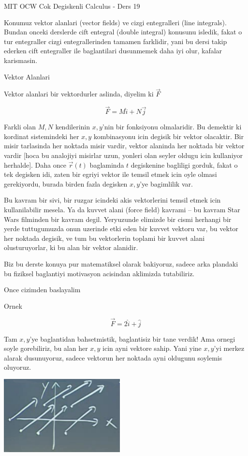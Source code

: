 \documentclass[12pt,fleqn]{article}
\begin{document}
MIT OCW Cok Degiskenli Calculus - Ders 19

Konumuz vektor alanlari (vector fields) ve cizgi entegralleri (line
integrals). Bundan onceki derslerde cift entegral (double integral)
konusunu isledik, fakat o tur entegraller cizgi entegrallerinden tamamen
farklidir, yani bu dersi takip ederken cift entegraller ile baglantilari
dusunmemek daha iyi olur, kafalar karismasin. 

Vektor Alanlari

Vektor alanlari bir vektordurler aslinda, diyelim ki $\vec{F}$

\[ \vec{F} = M\hat{i} + N\vec{j} \]

Farkli olan $M,N$ kendilerinin $x,y$'nin bir fonksiyonu olmalaridir. Bu
demektir ki kordinat sistemindeki her $x,y$ kombinasyonu icin degisik bir
vektor olacaktir. Bir misir tarlasinda her noktada misir vardir, vektor
alaninda her noktada bir vektor vardir [hoca bu analojiyi misirlar uzun,
yonleri olan seyler oldugu icin kullaniyor herhalde]. Daha once
$\vec{r}(t)$ baglaminda $t$ degiskenine bagliligi gorduk, fakat o tek
degisken idi, zaten bir egriyi vektor ile temsil etmek icin oyle olmasi
gerekiyordu, burada birden fazla degisken $x,y$'ye bagimlilik var. 

Bu kavram bir sivi, bir ruzgar icindeki akis vektorlerini temsil etmek icin
kullanilabilir mesela. Ya da kuvvet alani (force field) kavrami -- bu
kavram Star Wars filminden bir kavram degil. Yeryuzunde elimizde bir cismi
herhangi bir yerde tuttugumuzda onun uzerinde etki eden bir kuvvet vektoru
var, bu vektor her noktada degisik, ve tum bu vektorlerin toplami bir
kuvvet alani olusturuyorlar, ki bu alan bir vektor alanidir. 

Biz bu derste konuya pur matematiksel olarak bakiyoruz, sadece arka
plandaki bu fiziksel baglantiyi motivasyon acisindan aklimizda
tutabiliriz. 

Once cizimden baslayalim

Ornek

\[ \vec{F} = 2\hat{i} + \hat{j} \]

Tam $x,y$'ye baglantidan bahsetmistik, baglantisiz bir tane verdik! Ama
ornegi soyle gorebiliriz, bu alan her $x,y$ icin ayni vektore sahip. Yani
yine $x,y$'yi merkez alarak dusunuyoruz, sadece vektorun her noktada ayni
oldugunu soylemis oluyoruz.

\includegraphics[height=4cm]{19_1.png}
\end{document}
